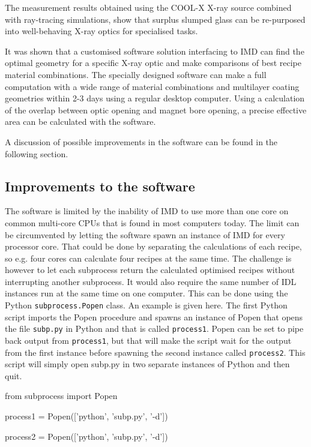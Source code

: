 The measurement results obtained using the COOL-X X-ray source combined with ray-tracing simulations, show that surplus slumped glass can be re-purposed into well-behaving X-ray optics for specialised tasks.

It was shown that a customised software solution interfacing to IMD can find the optimal geometry for a specific X-ray optic and make comparisons of best recipe material combinations. The specially designed software can make a full computation with a wide range of material combinations and multilayer coating geometries within 2-3 days using a regular desktop computer. Using a calculation of the overlap between optic opening and magnet bore opening, a precise effective area can be calculated with the software.

A discussion of possible improvements in the software can be found in the following section.

\subsection{Improvements to the software}\label{sec:software_improvements}
The software is limited by the inability of IMD to use more than one core on common multi-core CPUs that is found in most computers today. The limit can be circumvented by letting the software spawn an instance of IMD for every processor core. That could be done by separating the calculations of each recipe, so e.g. four cores can calculate four recipes at the same time. The challenge is however to let each subprocess return the calculated optimised recipes without interrupting another subprocess. It would also require the same number of IDL instances run at the same time on one computer. This can be done using the Python \verb|subprocess.Popen| class. An example is given here. The first Python script imports the Popen procedure and spawns an instance of Popen that opens the file \verb|subp.py| in Python and that is called \verb|process1|. Popen can be set to pipe back output from \verb|process1|, but that will make the script wait for the output from the first instance before spawning the second instance called \verb|process2|. This script will simply open subp.py in two separate instances of Python and then quit.

\begin{verbcode}
from subprocess import Popen

process1 = Popen(['python', 'subp.py', '-d'])

process2 = Popen(['python', 'subp.py', '-d'])
\end{verbcode}

